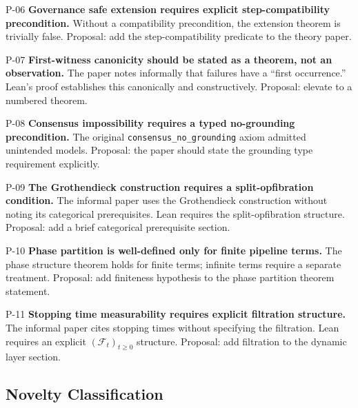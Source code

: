 \begin{proposal}{P-06}
\textbf{Governance safe extension requires explicit step-compatibility precondition.}
Without a compatibility precondition, the extension theorem is trivially false.
Proposal: add the step-compatibility predicate to the theory paper.
\end{proposal}

\begin{proposal}{P-07}
\textbf{First-witness canonicity should be stated as a theorem, not an observation.}
The paper notes informally that failures have a ``first occurrence.'' Lean's
proof establishes this canonically and constructively. Proposal: elevate to a
numbered theorem.
\end{proposal}

\begin{proposal}{P-08}
\textbf{Consensus impossibility requires a typed no-grounding precondition.}
The original \texttt{consensus\_no\_grounding} axiom admitted unintended models.
Proposal: the paper should state the grounding type requirement explicitly.
\end{proposal}

\begin{proposal}{P-09}
\textbf{The Grothendieck construction requires a split-opfibration condition.}
The informal paper uses the Grothendieck construction without noting its
categorical prerequisites. Lean requires the split-opfibration structure.
Proposal: add a brief categorical prerequisite section.
\end{proposal}

\begin{proposal}{P-10}
\textbf{Phase partition is well-defined only for finite pipeline terms.}
The phase structure theorem holds for finite terms; infinite terms require a
separate treatment. Proposal: add finiteness hypothesis to the phase partition
theorem statement.
\end{proposal}

\begin{proposal}{P-11}
\textbf{Stopping time measurability requires explicit filtration structure.}
The informal paper cites stopping times without specifying the filtration. Lean
requires an explicit $(\mathcal{F}_t)_{t\geq 0}$ structure. Proposal: add
filtration to the dynamic layer section.
\end{proposal}

\subsection{Novelty Classification}

